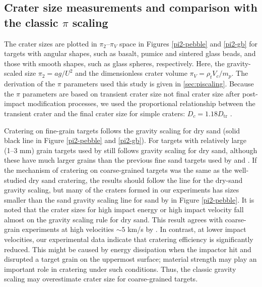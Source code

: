 \documentclass[3p,authoryear]{elsarticle}
\begin{document}
 \subsection{Crater size measurements and comparison with the classic $\pi$ scaling} \label{sec: classic pi}
The crater sizes are plotted in $\pi_2$--$\pi_V$ space \citep[e.g.][]{holsapple1993} in Figures \ref{pi2-pebble} and \ref{pi2-gb} for targets with angular shapes, such as basalt, pumice and sintered glass beads, and those with smooth shapes, such as glass spheres, respectively.
Here, the gravity-scaled size $\pi_2=ag/ U^2$ and the dimensionless crater volume $\pi_V=\rho_t V_c/m_p$.
The derivation of the $\pi$ parameters used this study is given in \ref{sec:piscaling}.
Because the $\pi$ parameters are based on transient crater size not final crater size after post-impact modification processes, we used the proportional relationship between the transient crater and the final crater size for simple craters: $D_c=1.18D_\text{tr}$ \citep{chapman1986,melosh1989}.

Cratering on fine-grain targets \citep{schmidt1980,mizutani1983,cintala1999} follows the gravity scaling for dry sand (solid black line in Figure \ref{pi2-pebble} and \ref{pi2-gb}).
For targets with relatively large (1--3 mm) grain targets used by \citet{cintala1999} still follows gravity scaling for dry sand, although these have much larger grains than the previous fine sand targets used by \citet{schmidt1980} and \citet{mizutani1983}.
If the mechanism of cratering on coarse-grained targets was the same as the well-studied dry sand cratering, the results should follow the line for the dry-sand gravity scaling, but many of the craters formed in our experiments has sizes smaller than the sand gravity scaling line for sand by \citet{schmidt1987} in Figure \ref{pi2-pebble}.
It is noted that the crater sizes for high impact energy or high impact velocity fall almost on the gravity scaling rule for dry sand.
This result agrees with coarse-grain experiments at high velocities $\sim 5$ km/s by \citet{holsapple2014}.
In contrast, at lower impact velocities, our experimental data indicate that cratering efficiency is significantly reduced.
This might be caused by energy dissipation when the impactor hit and disrupted a target grain on the uppermost surface; material strength may play an important role in cratering under such conditions.
Thus, the classic gravity scaling may overestimate crater size for coarse-grained targets.
\end{document}
